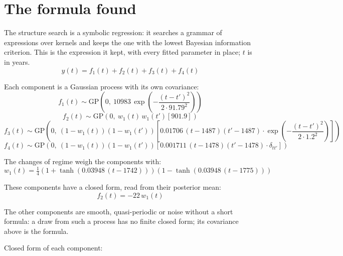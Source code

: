 \documentclass[11pt,a4paper]{article}
\begin{document}
\section*{The formula found}

The structure search is a symbolic regression: it searches a grammar of expressions over kernels and keeps the one with the lowest Bayesian information criterion. This is the expression it kept, with every fitted parameter in place; $t$ is in years.
\begin{dmath*}
y(t) = f_{1}(t) + f_{2}(t) + f_{3}(t) + f_{4}(t)
\end{dmath*}

Each component is a Gaussian process with its own covariance:
\begin{dmath*}
f_{1}(t) \sim \mathrm{GP}\!\left(0,\ 10983\,\exp\!\left(-\frac{(t - t')^2}{2 \cdot 91.79^2}\right)\right)
\end{dmath*}
\begin{dmath*}
f_{2}(t) \sim \mathrm{GP}\!\left(0,\ w_{1}(t)\,w_{1}(t')\left[901.9\right]\right)
\end{dmath*}
\begin{dmath*}
f_{3}(t) \sim \mathrm{GP}\!\left(0,\ (1 - w_{1}(t))(1 - w_{1}(t'))\left[0.01706\,(t - 1487)(t' - 1487) \cdot \exp\!\left(-\frac{(t - t')^2}{2 \cdot 1.2^2}\right)\right]\right)
\end{dmath*}
\begin{dmath*}
f_{4}(t) \sim \mathrm{GP}\!\left(0,\ (1 - w_{1}(t))(1 - w_{1}(t'))\left[0.001711\,(t - 1478)(t' - 1478) \cdot \delta_{t t'}\right]\right)
\end{dmath*}

The changes of regime weigh the components with:
\begin{dmath*}
w_{1}(t) = \tfrac{1}{4}\left(1 + \tanh\left(0.03948\,(t - 1742)\right)\right)\left(1 - \tanh\left(0.03948\,(t - 1775)\right)\right)
\end{dmath*}

These components have a closed form, read from their posterior mean:
\begin{dmath*}
f_{2}(t) = -22\,w_{1}(t)
\end{dmath*}

The other components are smooth, quasi-periodic or noise without a short formula: a draw from such a process has no finite closed form; its covariance above is the formula.

Closed form of each component:
\end{document}
